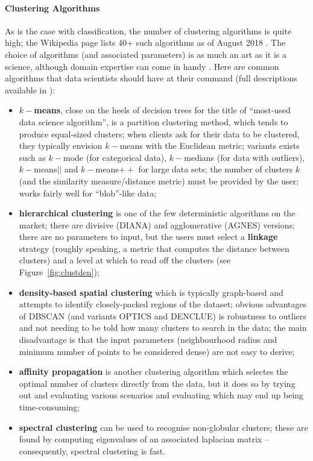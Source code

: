 \paragraph{Clustering Algorithms} As is the case with classification, the number of clustering algorithms is quite high; the Wikipedia page lists 40+ such algorithms as of August 2018 \cite{DSML_CL16}. The choice of algorithms (and associated parameters) is as much an art as it is a science, although domain expertise can come in handy \cite{DSML_CL1}. Here are common algorithms that data scientists should have at their command (full descriptions available in \cite{DSML_T,DSML_PF,DSML_CL1}):
\begin{itemize}[noitemsep]
\item \textbf{$k-$means}, close on the heels of decision trees for the title of ``most-used data science algorithm'', is a partition clustering method, which tends to produce equal-sized clusters; when clients ask for their data to be clustered, they typically envision $k-$means with the Euclidean metric; variants exists such as $k-$mode (for categorical data), $k-$medians (for data with outliers), $k-$means$||$ and $k-$means$++$ for large data sets; the number of clusters $k$ (and the similarity measure/distance metric) must be provided by the user; works fairly well for ``blob''-like data; 
\item \textbf{hierarchical clustering} is one of the few deterministic algorithms on the market; there are divisive (DIANA) and agglomerative (AGNES) versions; there are no parameters to input, but the users must select a \textbf{linkage} strategy (roughly speaking, a metric that computes the distance between clusters) and a level at which to read off the clusters (see Figure~\ref{fig:clustden});  
\item \textbf{density-based spatial clustering} which is typically graph-based and attempts to identify closely-packed regions of the dataset; obvious advantages of DBSCAN (and variants OPTICS and DENCLUE) is robustness to outliers and not needing to be told how many clusters to search in the data; the main disadvantage is that the input parameters (neighbourhood radius and minimum number of points to be considered dense) are not easy to derive;  
\item \textbf{affinity propagation} is another clustering algorithm which selectes the optimal number of clusters directly from the data, but it does so by trying out and evaluating various scenarios and evaluating which may end up being time-consuming; 
\item \textbf{spectral clustering} can be used to recognise non-globular clusters; these are found by computing eigenvalues of an associated laplacian matrix -- consequently, spectral clustering is fast. 
\end{itemize}
